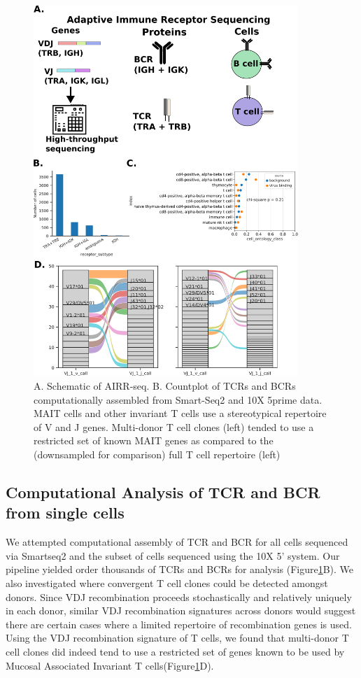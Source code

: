 \begin{figure}[hbt!]
\centering
\includegraphics[width=10cm, keepaspectratio]{figs/TabulaSapiens/fig2_tabula_airr.png}
\caption[AIRR-seq for analyzing the T cell Repertoire in Tabula Sapiens]{A. Schematic of AIRR-seq. B. Countplot of TCRs and BCRs computationally assembled from Smart-Seq2 and 10X 5prime data. MAIT cells and other invariant T cells use a stereotypical repertoire of V and J genes. Multi-donor T cell clones (left) tended to use a restricted set of known MAIT genes as compared to the (downsampled for comparison) full T cell repertoire (left)}
\label{fig:TabulaSapiens_airr}
\end{figure}



\subsection{Computational Analysis of TCR and BCR from single cells}
We attempted computational assembly of TCR and BCR for all cells sequenced via Smartseq2 and the subset of cells sequenced using the 10X 5' system. Our pipeline yielded order thousands of TCRs and BCRs for analysis (Figure\ref{fig:TabulaSapiens_airr}B). We also investigated where convergent T cell clones could be detected amongst donors. Since VDJ recombination proceeds stochastically and relatively uniquely in each donor, similar VDJ recombination signatures across donors would suggest there are certain cases where a limited repertoire of recombination genes is used. Using the VDJ recombination signature of T cells, we found that multi-donor T cell clones did indeed tend to use a restricted set of genes known to be used by Mucosal Associated Invariant T cells(Figure\ref{fig:TabulaSapiens_airr}D). 

